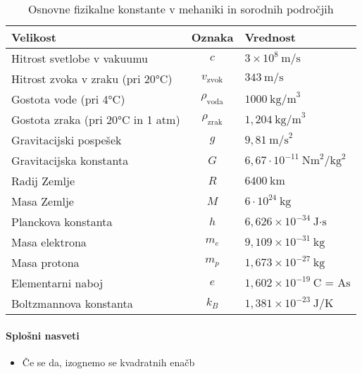 \begin{table}[h!]
    \centering
    \begin{tabular}{|l|c|l|}
    \hline
    \textbf{Velikost} & \textbf{Oznaka} & \textbf{Vrednost} \\
    \hline
    Hitrost svetlobe v vakuumu & $c$ & $3 \times 10^8 \ \text{m/s}$ \\
    \hline
    Hitrost zvoka v zraku (pri 20°C) & $v_{\text{zvok}}$ & $343 \ \text{m/s}$ \\
    \hline
    Gostota vode (pri 4°C) & $\rho_{\text{voda}}$ & $1000 \ \text{kg/m}^3$ \\
    \hline
    Gostota zraka (pri 20°C in 1 atm) & $\rho_{\text{zrak}}$ & $1{,}204 \ \text{kg/m}^3$ \\
    \hline
    Gravitacijski pospešek & $g$ & $9{,}81 \ \text{m/s}^2$ \\
    \hline
    Gravitacijska konstanta & $G$ & \(6{,}67 \cdot 10^{-11} \ \text{Nm}^2 / \text{kg}^2\) \\
    \hline
    Radij Zemlje & $R$ & \(6400 \ \text{km}\) \\
    \hline
    Masa Zemlje & $M$ & \(6 \cdot 10^{24} \ \text{kg}\) \\
    \hline
    Planckova konstanta & $h$ & $6{,}626 \times 10^{-34} \ \text{J·s}$ \\
    \hline
    Masa elektrona & $m_e$ & $9{,}109 \times 10^{-31} \ \text{kg}$ \\
    \hline
    Masa protona & $m_p$ & $1{,}673 \times 10^{-27} \ \text{kg}$ \\
    \hline
    Elementarni naboj & $e$ & $1{,}602 \times 10^{-19} \ \text{C = As}$ \\
    \hline
    Boltzmannova konstanta & $k_B$ & $1{,}381 \times 10^{-23} \ \text{J/K}$ \\
    \hline
    \end{tabular}
    \caption{Osnovne fizikalne konstante v mehaniki in sorodnih področjih}
\end{table}
    

\paragraph{Splošni nasveti}
\begin{itemize}    
    \item Če se da, izognemo se kvadratnih enačb
\end{itemize}